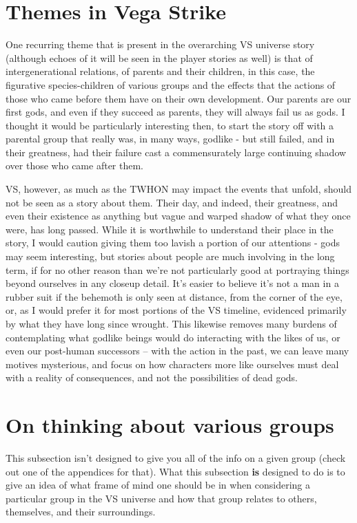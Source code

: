 \section{Themes in Vega Strike}

One recurring theme that is present in the overarching VS universe
story (although echoes of it will be seen in the player stories as
well) is that of intergenerational relations, of parents and their
children, in this case, the figurative species-children of various
groups and the effects that the actions of those who came before them
have on their own development. Our parents are our first gods, and
even if they succeed as parents, they will always fail us as gods. I
thought it would be particularly interesting then, to start the story
off with a parental group that really was, in many ways, godlike - but
still failed, and in their greatness, had their failure cast a
commensurately large continuing shadow over those who came after them.

VS, however, as much as the TWHON may impact the events that unfold,
should not be seen as a story about them. Their day, and indeed, their
greatness, and even their existence as anything but vague and warped
shadow of what they once were, has long passed. While it is worthwhile
to understand their place in the story, I would caution giving them
too lavish a portion of our attentions - gods may seem interesting,
but stories about people are much involving in the long term, if for
no other reason than we're not particularly good at portraying things
beyond ourselves in any closeup detail. It's easier to believe it's
not a man in a rubber suit if the behemoth is only seen at distance,
from the corner of the eye, or, as I would prefer it for most portions
of the VS timeline, evidenced primarily by what they have long since
wrought. This likewise removes many burdens of contemplating what
godlike beings would do interacting with the likes of us, or even our
post-human successors -- with the action in the past, we can leave
many motives mysterious, and focus on how characters more like
ourselves must deal with a reality of consequences, and not the
possibilities of dead gods.

\section{On thinking about various groups}

This subsection isn't designed to give you all of the info on a given
group (check out one of the appendices for that). What this subsection
{\bf is} designed to do is to give an idea of what frame of mind one
should be in when considering a particular group in the VS universe
and how that group relates to others, themselves, and their
surroundings.

